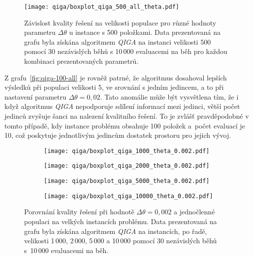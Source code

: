 \begin{figure}[ht!]
    \centering
    \texttt{[image: qiga/boxplot\_qiga\_500\_all\_theta.pdf]}
    \caption{Závislost kvality řešení na velikosti populace pro různé hodnoty parametru $\Delta\theta$ u instance s 500 položkami. Data prezentovaná na grafu byla získána algoritmem \emph{QIGA} na instanci velikosti 500 pomocí 30 nezávislých běhů s 10\,000 evaluacemi na běh pro každou kombinaci prezentovaných parametrů.}
    \label{fig:qiga-500-all}
\end{figure}

Z grafu~\ref{fig:qiga-100-all} je rovněž patrné, že algoritmus dosahoval lepších výsledků při populaci velikosti 5, ve srovnání s jedním jedincem, a to při nastavení parametru $\Delta\theta = 0,02$.  
Tato anomálie může být vysvětlena tím, že i když algoritmus \emph{QIGA} nepodporuje sdílení informací mezi jedinci, větší počet jedinců zvyšuje šanci na nalezení kvalitního řešení. 
To je zvlášť pravděpodobné v tomto případě, kdy instance problému obsahuje 100 položek a~počet evaluací je 10, což poskytuje jednotlivým jedincům dostatek prostoru pro jejich vývoj. 

\begin{figure}[ht!]
    \centering
    \begin{subfigure}[b]{0.24\textwidth}
      \texttt{[image: qiga/boxplot\_qiga\_1000\_theta\_0.002.pdf]}
    \end{subfigure}
    \hfill
    \begin{subfigure}[b]{0.24\textwidth}
        \texttt{[image: qiga/boxplot\_qiga\_2000\_theta\_0.002.pdf]}
    \end{subfigure}
    \hfill
    \begin{subfigure}[b]{0.24\textwidth}
        \texttt{[image: qiga/boxplot\_qiga\_5000\_theta\_0.002.pdf]}
    \end{subfigure}
    \hfill
    \begin{subfigure}[b]{0.24\textwidth}
        \texttt{[image: qiga/boxplot\_qiga\_10000\_theta\_0.002.pdf]}
    \end{subfigure}
  
    \caption{Porovnání kvality řešení při hodnotě $\Delta\theta = 0,002$ a jednočlenné populaci na velkých instancích problému. Data prezentovaná na grafu byla získána algoritmem \emph{QIGA} na instancích, po řadě, velikosti 1\,000, 2\,000, 5\,000 a 10\,000 pomocí 30 nezávislých běhů s~10\,000 evaluacemi na běh.}
    \label{fig:qiga-large}
\end{figure}

